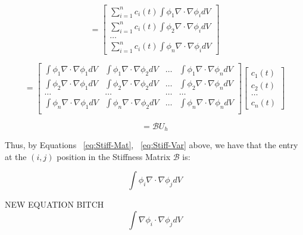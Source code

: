 \begin{equation}
= \begin{bmatrix}
\sum\limits_{i=1}^n c_i(t) \int \phi_1 \nabla \cdot \nabla \phi_i dV \\
\sum\limits_{i=1}^n c_i(t) \int \phi_2 \nabla \cdot \nabla \phi_i dV \\
\ldots \\
\sum\limits_{i=1}^n c_i(t) \int \phi_n \nabla \cdot \nabla \phi_i dV
\end{bmatrix}
\end{equation}

\begin{equation}
\label{eq:Stiff-Mat}
= \begin{bmatrix}
\int \phi_1 \nabla \cdot \nabla \phi_1 dV & \int \phi_1 \nabla \cdot \nabla \phi_2 dV & \ldots & \int \phi_1 \nabla \cdot \nabla \phi_n dV \\
\int \phi_2 \nabla \cdot \nabla \phi_1 dV & \int \phi_2 \nabla \cdot \nabla \phi_2 dV & \ldots & \int \phi_2 \nabla \cdot \nabla \phi_n dV \\
\ldots & \ldots & \ldots & \ldots \\
\int \phi_n \nabla \cdot \nabla \phi_1 dV & \int \phi_n \nabla \cdot \nabla \phi_2 dV & \ldots & \int \phi_n \nabla \cdot \nabla \phi_n dV \\
\end{bmatrix} 
\begin{bmatrix}
c_1(t) \\
c_2(t) \\
\ldots \\
c_n(t)
\end{bmatrix}
\end{equation}

\begin{equation}
\label{eq:Stiff-Var}
= \mathcal{B} U_h
\end{equation}

Thus, by Equations ~\ref{eq:Stiff-Mat}, ~\ref{eq:Stiff-Var} above, we have that the entry at the $(i,j)$ position in the Stiffness Matrix $\mathcal{B}$ is:

\begin{equation}
\label{eq:Stiff-Eq-PML}
\int \phi_i \nabla \cdot \nabla \phi_j dV
\end{equation}



NEW EQUATION BITCH
\begin{equation}
\label{eq:Stiff-Eq-ABC}
\int \nabla \phi_i \cdot \nabla \phi_j dV
\end{equation}

